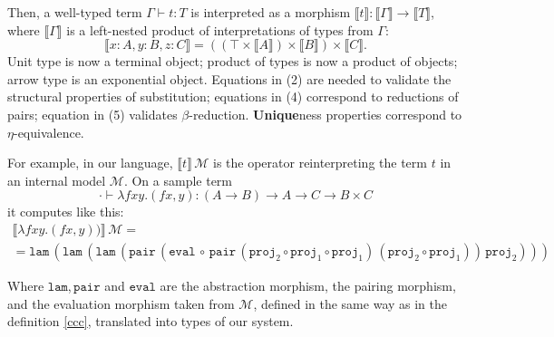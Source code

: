 Then, a well-typed term $\Gamma\vdash t:T$ is
interpreted as a morphism $\llbracket t\rrbracket:
\llbracket\Gamma\rrbracket\to\llbracket T\rrbracket$,
where $\llbracket\Gamma\rrbracket$ is a left-nested
product of interpretations of types from $\Gamma$:
\[
    \llbracket x:A,y:B,z:C\rrbracket=
    ((\top\times\llbracket A\rrbracket)
    \times\llbracket B\rrbracket)
    \times\llbracket C\rrbracket.
\]
Unit type is now a terminal object; product of types is now a product of
objects; arrow type is an exponential object. Equations
in (2) are needed to validate the structural properties of
substitution; equations in (4) correspond to reductions
of pairs; equation in (5) validates $\beta$-reduction.
\textbf{Unique}ness properties correspond to
$\eta$-equivalence.

For example, in our language,
$\llbracket t\rrbracket\,\mathcal{M}$ is the operator reinterpreting the term $t$ in an internal model
$\mathcal{M}$. On a sample term
\[
    \cdot\vdash\lambda f x y. (f x, y):
        (A\to B)\to A\to C\to B\times C
\]
it computes like this:
\begin{multline*}
    \llbracket\lambda f x y. (f x, y))\rrbracket\,
    \mathcal{M}=\\=
    \mathtt{lam}\,(\mathtt{lam}\,(\mathtt{lam}\,(
        \mathtt{pair}\,
            (\mathtt{eval}\,\circ\,\mathtt{pair}\,
                (\mathtt{proj}_2\circ\mathtt{proj}_1
                    \circ\mathtt{proj}_1
                )\,
                (\mathtt{proj}_2\circ\mathtt{proj}_1)
            )\,
            \mathtt{proj}_2
    )))
\end{multline*}

Where $\mathtt{lam}$,\,$\mathtt{pair}$ and
$\mathtt{eval}$ are the abstraction
morphism, the pairing morphism, and the evaluation morphism taken
from $\mathcal{M}$, defined in the same way as in the
definition \ref{ccc}, translated into types of our
system.

